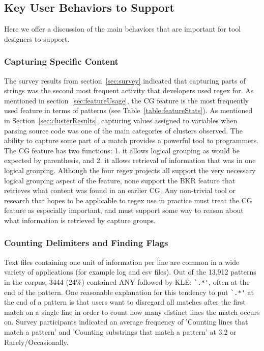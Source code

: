 \subsection{Key User Behaviors to Support}
Here we offer a discussion of the main behaviors that are important for tool designers to support.

\subsubsection{Capturing Specific Content}
The survey results from section~\ref{sec:survey} indicated that capturing parts of strings was the second most frequent activity that developers used regex for.  As mentioned in section~\ref{sec:featureUsage}, the CG feature is the most frequently used feature in terms of patterns (see Table~\ref{table:featureStats}).  As mentioned in Section~\ref{sec:clusterResults}, capturing values assigned to variables when parsing source code was one of the main categories of clusters observed.  The ability to capture some part of a match provides a powerful tool to programmers.  The CG feature has two functions: 1. it allows logical grouping as would be expected by parenthesis, and 2. it allows retrieval of information that was in one logical grouping.  Although the four regex projects all support the very necessary logical grouping aspect of the feature, none support the BKR feature that retrieves what content was found in an earlier CG.  Any non-trivial tool or research that hopes to be applicable to regex use in practice must treat the CG feature as especially important, and must support some way to reason about what information is retrieved by capture groups.

\subsubsection{Counting Delimiters and Finding Flags}
Text files containing one unit of information per line are common in a wide variety of applications (for example log and csv files).  Out of the 13,912 patterns in the corpus, 3444 (24\%) contained ANY followed by KLE: \verb!`.*'!, often at the end of the pattern.
One reasonable explanation for this tendency to put \verb!`.*'! at the end of a pattern is that users want to disregard all matches after the first match on a single line in order to count how many distinct lines the match occurs on.  Survey participants indicated an average frequency of 'Counting lines that match a pattern' and 'Counting substrings that match a pattern' at 3.2 or Rarely/Occasionally.

